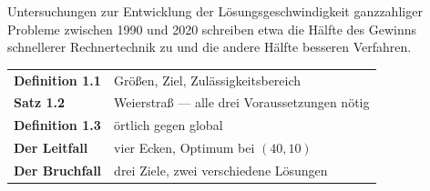\begin{forschung}
Untersuchungen zur Entwicklung der Lösungsgeschwindigkeit ganzzahliger Probleme zwischen 1990 und 2020 schreiben etwa die Hälfte des Gewinns schnellerer Rechnertechnik zu und die andere Hälfte besseren Verfahren.

\begin{center}
\begin{minipage}{0.88\textwidth}
\end{minipage}
\end{center}
\end{forschung}

\begin{merksatz}
\begin{center}
\renewcommand{\arraystretch}{1.5}
\begin{tabular}{@{}P{3.0cm}P{5.6cm}@{}}
\toprule
\textbf{Definition 1.1} & Größen, Ziel, Zulässigkeitsbereich\\
\textbf{Satz 1.2} & Weierstraß --- alle drei Voraussetzungen nötig\\
\textbf{Definition 1.3} & örtlich gegen global\\
\textbf{Der Leitfall} & vier Ecken, Optimum bei $(40,10)$\\
\textbf{Der Bruchfall} & drei Ziele, zwei verschiedene Lösungen\\
\bottomrule
\end{tabular}
\end{center}

\begin{center}
\begin{minipage}{0.88\textwidth}
\end{minipage}
\end{center}
\end{merksatz}
